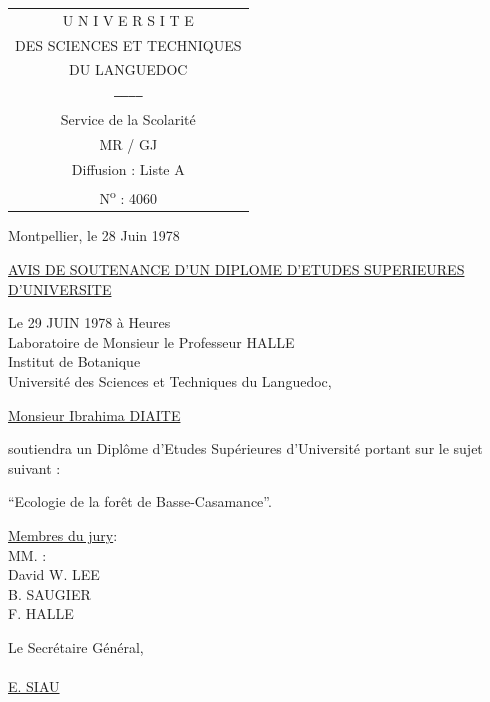 
\begin{tabular}{c}
U N I V E R S I T E\\
DES SCIENCES ET TECHNIQUES\\
DU LANGUEDOC\\
\texttt{------------}\\
Service de la Scolarité\\
MR / GJ\\
Diffusion \quad : Liste A\\
N\textsuperscript{o} : 4060
\end{tabular}

Montpellier, le 28 Juin 1978

\uline{AVIS DE SOUTENANCE D'UN DIPLOME D'ETUDES SUPERIEURES D'UNIVERSITE}

Le 29 JUIN 1978 \qquad à  Heures\\
Laboratoire de Monsieur le Professeur HALLE\\
Institut de Botanique\\
Université des Sciences et Techniques du Languedoc,

\uline{Monsieur Ibrahima DIAITE}

soutiendra un Diplôme d'Etudes Supérieures d'Université portant sur le sujet suivant :

``Ecologie de la forêt de Basse-Casamance''.

\uline{Membres du jury}:\\
MM. :\\
\hspace*{1em}David W. LEE\\
\hspace*{1em}B. SAUGIER\\
\hspace*{1em}F. HALLE

Le Secrétaire Général,\\

\\

\uline{E. SIAU}
